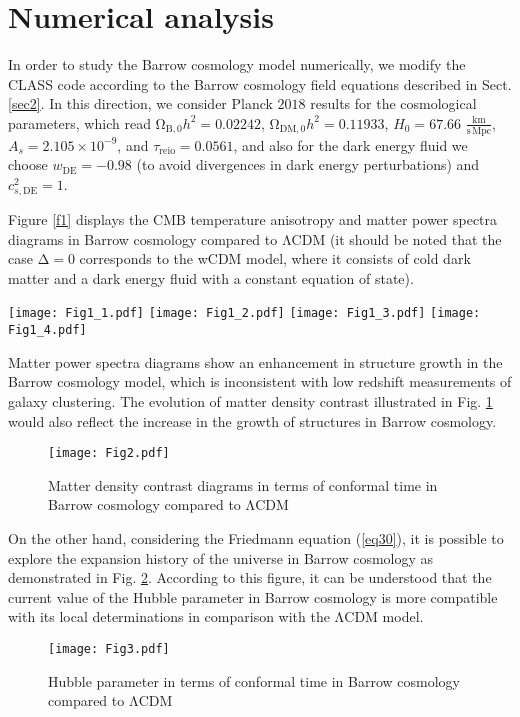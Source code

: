 \documentclass[11pt,twocolumn]{article}
\begin{document}
\section{Numerical analysis} \label{sec3}
In order to study the Barrow cosmology model numerically, we
modify the CLASS code according to the Barrow cosmology field
equations described in Sect. \ref{sec2}. In this direction, we
consider Planck $2018$ results \cite{p18} for the cosmological
parameters, which read $\mathrm{\Omega}_{\mathrm{B},0}h^2=0.02242$,
$\mathrm{\Omega}_{\mathrm{DM},0}h^2=0.11933$, $H_0=67.66$
$\mathrm{\frac{km}{s\,Mpc}}$, $A_s=2.105 \times 10^{-9}$, and
$\tau_\mathrm{reio}=0.0561$, and also for the dark energy fluid we choose
$w_\mathrm{DE}=-0.98$ (to avoid divergences in dark energy perturbations) 
and $c_{s,\mathrm{DE}}^2=1$.

Figure \ref{f1} displays the CMB temperature anisotropy and
matter power spectra diagrams in Barrow cosmology compared to
$\mathrm{\Lambda}$CDM (it should be noted that the case $\mathrm{\Delta}=0$ corresponds to the wCDM model, where it consists of cold dark matter and a dark energy fluid with a constant equation of state).
\begin{figure*}[ht!]
        \texttt{[image: Fig1\_1.pdf]}
        \texttt{[image: Fig1\_2.pdf]}
        \texttt{[image: Fig1\_3.pdf]}
        \texttt{[image: Fig1\_4.pdf]}
        \caption{The CMB power spectra (upper left) and their relative ratios with respect to $\mathrm{\Lambda}$CDM (upper right) for different values of $\mathrm{\Delta}$. Lower panels show the analogous diagrams for the matter power spectrum}
        \label{f1}
\end{figure*}

Matter power spectra diagrams show an enhancement in structure
growth in the Barrow cosmology model, which is inconsistent with
low redshift measurements of galaxy clustering. The evolution of
matter density contrast illustrated in Fig. \ref{f2} would
also reflect the increase in the growth of structures in Barrow
cosmology.
    \begin{figure}[ht!]
        \centering
        \texttt{[image: Fig2.pdf]}
        \caption{Matter density contrast diagrams in terms of conformal time in Barrow cosmology compared to $\mathrm{\Lambda}$CDM}
        \label{f2}
    \end{figure}
    
On the other hand, considering the Friedmann equation (\ref{eq30}), it is possible to
explore the expansion history of the universe in Barrow cosmology
as demonstrated in Fig. \ref{f3}. According to this figure, it
can be understood that the current value of the Hubble parameter in
Barrow cosmology is more compatible with its local determinations
in comparison with the $\mathrm{\Lambda}$CDM model.
    \begin{figure}[ht!]
        \centering
        \texttt{[image: Fig3.pdf]}
        \caption{Hubble parameter in terms of conformal time in Barrow cosmology compared to $\mathrm{\Lambda}$CDM}
        \label{f3}
    \end{figure}
    
\end{document}
